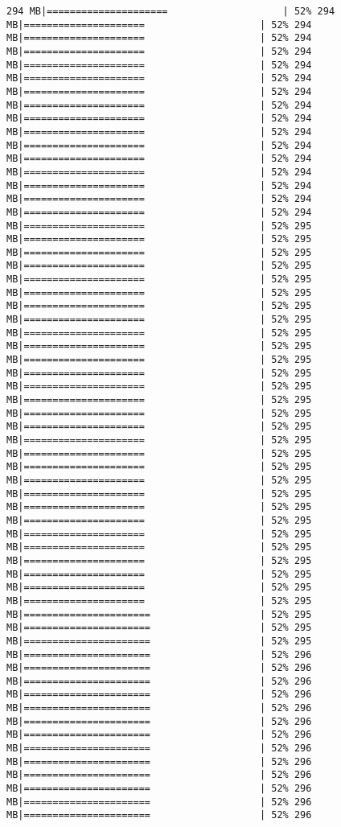 \documentclass[
]{article}
\begin{document}
\begin{verbatim}
294 MB|=====================                    | 52% 294 MB|=====================                    | 52% 294 MB|=====================                    | 52% 294 MB|=====================                    | 52% 294 MB|=====================                    | 52% 294 MB|=====================                    | 52% 294 MB|=====================                    | 52% 294 MB|=====================                    | 52% 294 MB|=====================                    | 52% 294 MB|=====================                    | 52% 294 MB|=====================                    | 52% 294 MB|=====================                    | 52% 294 MB|=====================                    | 52% 294 MB|=====================                    | 52% 294 MB|=====================                    | 52% 294 MB|=====================                    | 52% 294 MB|=====================                    | 52% 295 MB|=====================                    | 52% 295 MB|=====================                    | 52% 295 MB|=====================                    | 52% 295 MB|=====================                    | 52% 295 MB|=====================                    | 52% 295 MB|=====================                    | 52% 295 MB|=====================                    | 52% 295 MB|=====================                    | 52% 295 MB|=====================                    | 52% 295 MB|=====================                    | 52% 295 MB|=====================                    | 52% 295 MB|=====================                    | 52% 295 MB|=====================                    | 52% 295 MB|=====================                    | 52% 295 MB|=====================                    | 52% 295 MB|=====================                    | 52% 295 MB|=====================                    | 52% 295 MB|=====================                    | 52% 295 MB|=====================                    | 52% 295 MB|=====================                    | 52% 295 MB|=====================                    | 52% 295 MB|=====================                    | 52% 295 MB|=====================                    | 52% 295 MB|=====================                    | 52% 295 MB|=====================                    | 52% 295 MB|=====================                    | 52% 295 MB|=====================                    | 52% 295 MB|=====================                    | 52% 295 MB|======================                   | 52% 295 MB|======================                   | 52% 295 MB|======================                   | 52% 295 MB|======================                   | 52% 296 MB|======================                   | 52% 296 MB|======================                   | 52% 296 MB|======================                   | 52% 296 MB|======================                   | 52% 296 MB|======================                   | 52% 296 MB|======================                   | 52% 296 MB|======================                   | 52% 296 MB|======================                   | 52% 296 MB|======================                   | 52% 296 MB|======================                   | 52% 296 MB|======================                   | 52% 296 MB|======================                   | 52% 296 
\end{verbatim}
\end{document}
